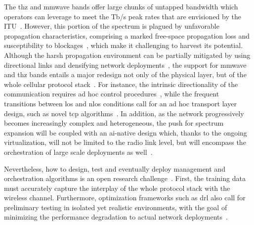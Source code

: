 The \gls{thz} and \gls{mmwave} bands offer large chunks of untapped bandwidth which operators can leverage to meet the Tb/s peak rates that are envisioned by the ITU~\cite{imt2030}. However, this portion of the spectrum is plagued by unfavorable propagation characteristics, comprising a marked free-space propagation loss and susceptibility to blockages~\cite{han2018propagation, jornet2011channel}, which make it challenging to harvest its potential. Although the harsh propagation environment can be partially mitigated by using directional links 
and densifying network deployments~\cite{polese2020toward}, 
the support for \gls{mmwave} and \gls{thz} bands entails a major redesign not only of the physical layer, but of the whole cellular protocol stack~\cite{shafi2018microwave}. For instance, the intrinsic directionality of the communication requires ad hoc control procedures~\cite{heng2021six}, while the frequent transitions between \gls{los} and \gls{nlos} conditions call for an ad hoc transport layer design, such as novel \gls{tcp} algorithms~\cite{zhang2019will}. 
In addition, as the network progressively becomes increasingly complex and heterogeneous, the push for spectrum expansion will be coupled with an \gls{ai}-native design which, thanks to the ongoing virtualization, will not be limited to the radio link level, but will encompass the orchestration of large scale deployments as well~\cite{polese2023understanding}.


Nevertheless, how to design, test and eventually deploy management and orchestration algorithms is an open research challenge~\cite{polese2022colo}.
First, the training data must accurately capture the interplay of the whole protocol stack with the wireless channel. Furthermore, optimization frameworks such as \gls{drl} also call for preliminary testing in isolated yet realistic environments, with the goal of minimizing the performance degradation to actual network deployments~\cite{lacava2022programmable, amir2023safehaul}.

